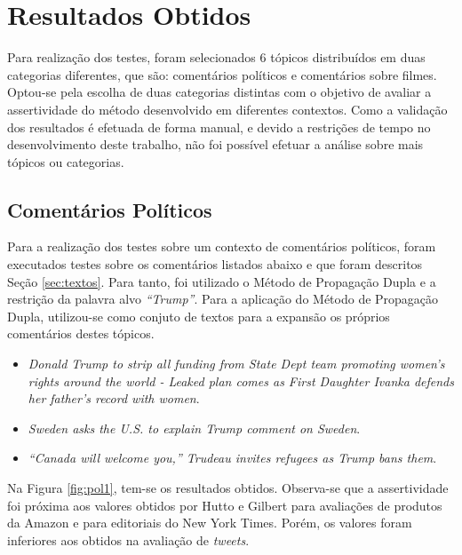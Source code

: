 \chapter{Resultados Obtidos}
\label{cap:impl}

Para realização dos testes, foram
selecionados 6 tópicos distribuídos em duas categorias diferentes, que são:
comentários políticos e comentários sobre filmes. Optou-se pela escolha de duas
categorias distintas com o objetivo de avaliar a assertividade do método
desenvolvido em diferentes contextos. Como a validação dos resultados é efetuada
de forma manual, e devido a restrições de tempo no desenvolvimento deste
trabalho, não foi possível efetuar a análise sobre mais tópicos ou categorias.

\section{Comentários Políticos}
\label{sec:pol}
Para a realização dos testes sobre um contexto de comentários políticos,
foram executados testes sobre os comentários listados abaixo e que foram
descritos Seção \ref{sec:textos}. Para tanto, foi utilizado o Método de
Propagação Dupla e a restrição da palavra alvo \textit{``Trump''}. Para a
aplicação do Método de Propagação Dupla, utilizou-se como conjuto de textos
para a expansão os próprios comentários destes tópicos.

\begin{itemize}
  \item
  \textit{Donald Trump to strip all funding from State Dept team promoting
  women's rights around the world - Leaked plan comes as First Daughter Ivanka
  defends her father's record with women}.  
  \item
  \textit{Sweden asks the U.S. to explain Trump comment on
  Sweden}.
  
  \item\textit{“Canada will welcome you,” Trudeau invites refugees as Trump bans
  them}.
\end{itemize}

Na Figura \ref{fig:pol1}, tem-se os resultados obtidos. Observa-se que
a assertividade foi próxima aos valores obtidos por Hutto e Gilbert
\cite{conf/icwsm/HuttoG14} para avaliações de produtos da Amazon e para
editoriais do New York Times. Porém, os valores foram inferiores aos obtidos na
avaliação de \textit{tweets}. 

\newpage
 
